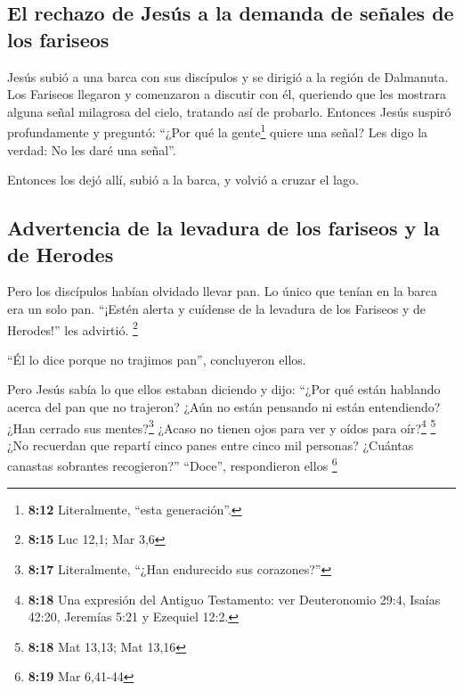 \hypertarget{el-rechazo-de-jesuxfas-a-la-demanda-de-seuxf1ales-de-los-fariseos}{%
\subsection{El rechazo de Jesús a la demanda de señales de los
fariseos}\label{el-rechazo-de-jesuxfas-a-la-demanda-de-seuxf1ales-de-los-fariseos}}

 Jesús subió a una barca con sus discípulos y se dirigió
a la región de Dalmanuta.  Los Fariseos llegaron y
comenzaron a discutir con él, queriendo que les mostrara alguna señal
milagrosa del cielo, tratando así de probarlo.  Entonces
Jesús suspiró profundamente y preguntó: ``¿Por qué la gente\footnote{\textbf{8:12}
  Literalmente, ``esta generación''.} quiere una señal? Les digo la
verdad: No les daré una señal''.

 Entonces los dejó allí, subió a la barca, y volvió a
cruzar el lago.

\hypertarget{advertencia-de-la-levadura-de-los-fariseos-y-la-de-herodes}{%
\subsection{Advertencia de la levadura de los fariseos y la de
Herodes}\label{advertencia-de-la-levadura-de-los-fariseos-y-la-de-herodes}}

 Pero los discípulos habían olvidado llevar pan. Lo único
que tenían en la barca era un solo pan.  ``¡Estén alerta
y cuídense de la levadura de los Fariseos y de Herodes!'' les advirtió.
\footnote{\textbf{8:15} Luc 12,1; Mar 3,6}

 ``Él lo dice porque no trajimos pan'', concluyeron
ellos.

 Pero Jesús sabía lo que ellos estaban diciendo y dijo:
``¿Por qué están hablando acerca del pan que no trajeron? ¿Aún no están
pensando ni están entendiendo? ¿Han cerrado sus mentes?\footnote{\textbf{8:17}
  Literalmente, ``¿Han endurecido sus corazones?''} 
¿Acaso no tienen ojos para ver y oídos para oír?\footnote{\textbf{8:18}
  Una expresión del Antiguo Testamento: ver Deuteronomio 29:4, Isaías
  42:20, Jeremías 5:21 y Ezequiel 12:2.} \footnote{\textbf{8:18} Mat
  13,13; Mat 13,16}  ¿No recuerdan que repartí cinco
panes entre cinco mil personas? ¿Cuántas canastas sobrantes
recogieron?'' ``Doce'', respondieron ellos \footnote{\textbf{8:19} Mar
  6,41-44}

